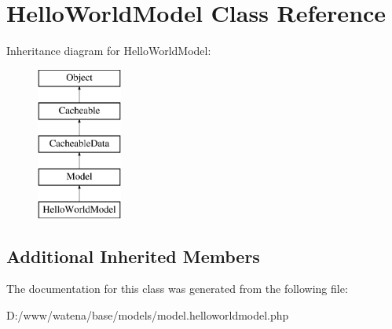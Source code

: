 \hypertarget{class_hello_world_model}{\section{Hello\-World\-Model Class Reference}
\label{class_hello_world_model}
}
Inheritance diagram for Hello\-World\-Model\-:\begin{figure}[H]
\begin{center}
\leavevmode
\includegraphics[height=5.000000cm]{class_hello_world_model}
\end{center}
\end{figure}
\subsection*{Additional Inherited Members}


The documentation for this class was generated from the following file\-:\begin{DoxyCompactItemize}
\item 
D\-:/www/watena/base/models/model.\-helloworldmodel.\-php\end{DoxyCompactItemize}
